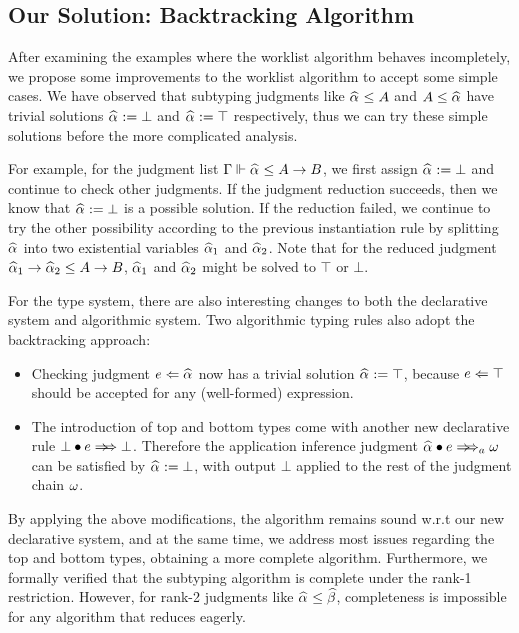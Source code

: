 

\subsection{Our Solution: Backtracking Algorithm}

After examining the examples where the worklist algorithm behaves incompletely,
we propose some improvements to the worklist algorithm to accept some simple cases.
We have observed that subtyping judgments like $\al \le A$ and $A \le \al$ have trivial solutions
$\al := \bot$ and $\al := \top$ respectively,
thus we can try these simple solutions before the more complicated analysis.

For example, for the judgment list $\Gm \Vdash \al \le A \to B$,
we first assign $\al := \bot$ and continue to check other judgments.
If the judgment reduction succeeds, then we know that $\al := \bot$ is a possible solution.
If the reduction failed, we continue to try the other possibility according to the
previous instantiation rule by splitting $\al$ into two existential variables $\al[1]$ and $\al[2]$.
Note that for the reduced judgment $\al[1] \to \al[2] \le A \to B$,
$\al[1]$ and $\al[2]$ might be solved to $\top$ or $\bot$.

For the type system, there are also interesting changes to
both the declarative system and algorithmic system.
Two algorithmic typing rules also adopt the backtracking approach:
\begin{itemize}
    \item Checking judgment $e \Lto \al$ now has a trivial solution $\al := \top$,
        because $e \Leftarrow \top$ should be accepted for any (well-formed) expression.
    \item The introduction of top and bottom types come with another new declarative rule
        $\appInf{\bot}{e}{\bot}$.
        Therefore the application inference judgment $\appInfAlg{\al}{e}$
        can be satisfied by $\al := \bot$,
        with output $\bot$ applied to the rest of the judgment chain $\omega$.
\end{itemize}

By applying the above modifications,
the algorithm remains sound w.r.t our new declarative system,
and at the same time, we address most issues regarding the top and bottom types,
obtaining a more complete algorithm.
Furthermore, we formally verified that the subtyping algorithm
is complete under the rank-1 restriction.
However, for rank-2 judgments like $\al \le \bt$,
completeness is impossible for any algorithm that reduces eagerly.

